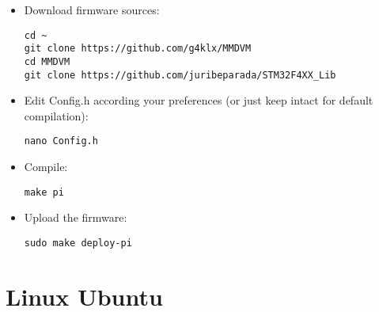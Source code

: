 \documentclass[]{article}
\begin{document}
\begin{itemize}[leftmargin=*]
	
\item Download firmware sources:
\begin{lstlisting}[style=DOS]
cd ~
git clone https://github.com/g4klx/MMDVM
cd MMDVM
git clone https://github.com/juribeparada/STM32F4XX_Lib
\end{lstlisting}

\item Edit Config.h according your preferences (or just keep intact for default compilation):
\begin{lstlisting}[style=DOS]
nano Config.h
\end{lstlisting}

\item Compile:
\begin{lstlisting}[style=DOS]
make pi
\end{lstlisting}

\item Upload the firmware:
\begin{lstlisting}[style=DOS]
sudo make deploy-pi
\end{lstlisting}

\end{itemize}

\section{Linux Ubuntu}
\end{document}
